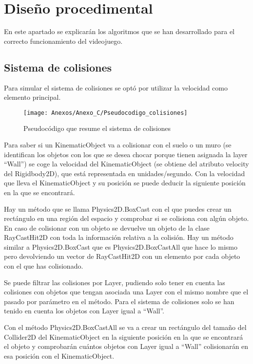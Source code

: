 \section{Diseño procedimental}
En este apartado se explicarán los algoritmos que se han desarrollado para el correcto funcionamiento del videojuego.

\subsection{Sistema de colisiones}
Para simular el sistema de colisiones se optó por utilizar la velocidad como elemento principal.

\clearpage
\begin{figure}[h]
\centering
\texttt{[image: Anexos/Anexo\_C/Pseudocodigo\_colisiones]}
\caption{Pseudocódigo que resume el sistema de colisiones}
\end{figure}

Para saber si un KinematicObject va a colisionar con el suelo o un muro (se identifican los objetos con los que se desea chocar porque tienen asignada la layer “Wall”) se coge la velocidad del KinematicObject (se obtiene del atributo velocity del Rigidbody2D), que está representada en unidades/segundo. Con la velocidad que lleva el KinematicObject y su posición se puede deducir la siguiente posición en la que se encontrará.

Hay un método que se llama Physics2D.BoxCast con el que puedes crear un rectángulo en una región del espacio y comprobar si se colisiona con algún objeto. En caso de colisionar con un objeto se devuelve un objeto de la clase RayCastHit2D con toda la información relativa a la colisión. Hay un método similar a Physics2D.BoxCast que es Physics2D.BoxCastAll que hace lo mismo pero devolviendo un vector de RayCastHit2D con un elemento por cada objeto con el que has colisionado.

Se puede filtrar las colisiones por Layer, pudiendo solo tener en cuenta las colisiones con objetos que tengan asociada una Layer con el mismo nombre que el pasado por parámetro en el método. Para el sistema de colisiones solo se han tenido en cuenta los objetos con Layer igual a “Wall”.

Con el método Physics2D.BoxCastAll se va a crear un rectángulo del tamaño del Collider2D del KinematicObject en la siguiente posición en la que se encontrará el objeto y comprobarán cuántos objetos con Layer igual a “Wall” colisionarán en esa posición con el KinematicObject.


